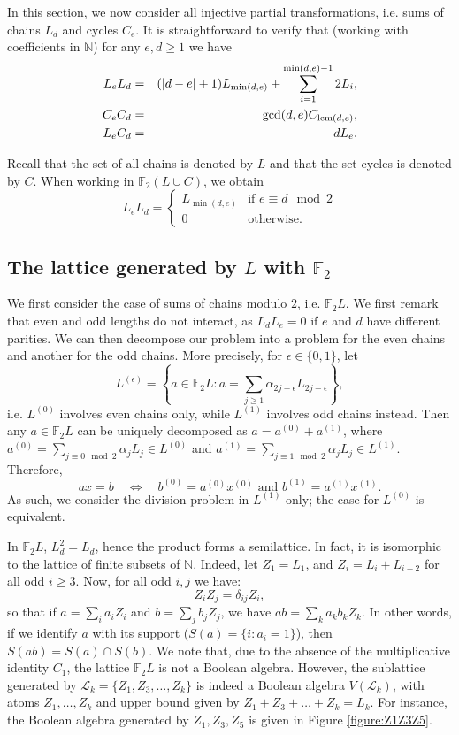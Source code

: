 \documentclass[a4paper, 11pt]{article}
\theoremstyle{plain}
\theoremstyle{definition}
\newcommand{\N} {\mathbb{N}}
\newcommand{\F} {\mathbb{F}}
\newcommand{\lcm}       {\mathrm{lcm}}
\begin{document}
In this section, we now consider all injective partial transformations, i.e. sums of chains 
$L_d$ and cycles $C_e$. It is straightforward to verify that (working with coefficients in $\N$) for any $e, d\geq 1$ we have
\begin{eqnarray*}
L_eL_d  &=& (|d-e|+1)L_{{\rm min}(d,e)} + \sum_{i=1}^{{\rm min}(d,e)-1} 2L_i,\\ 
C_eC_d &=& {\rm gcd}(d,e) C_{\lcm(d,e)},\\
L_eC_d &=& dL_e.
\end{eqnarray*}

Recall that the set of all chains is denoted by $L$ and that the set cycles is denoted by $C$. When working in $\F_2(L \cup C)$, we obtain
\[
    L_e L_d = \begin{cases}
        L_{\min( d,e )} & \text{if } e \equiv d \mod 2 \\
        0 &\text{otherwise}.
    \end{cases}
\]

\subsection{The lattice generated by $L$ with $\F_2$} \label{subsection:semiring_L2}

We first consider the case of sums of chains modulo $2$, i.e. $\F_2 L$. We first remark that even and odd lengths do not interact, as $L_d L_e = 0$ if $e$ and $d$ have different parities. We can then decompose our problem into a problem for the even chains and another for the odd chains. More precisely, for $\epsilon \in \{0,1\}$, let 
\[
    L^{(\epsilon)} = \left\{ a \in \F_2 L : a = \sum_{j \ge 1} \alpha_{2j - \epsilon} L_{2j - \epsilon} \right\}, 
\]
i.e. $L^{(0)}$ involves even chains only, while $L^{(1)}$ involves odd chains instead. Then any $a \in \F_2 L$ can be uniquely decomposed as $a = a^{(0)} + a^{(1)}$, where $a^{(0)} = \sum_{ j \equiv 0 \mod 2 } \alpha_j L_j \in L^{(0)}$ and $a^{(1)} = \sum_{ j \equiv 1 \mod 2 } \alpha_j L_j \in L^{(1)}$. Therefore,
\[
    a x = b \quad \iff \quad b^{(0)} = a^{(0)} x^{(0)} \text{ and } b^{(1)} = a^{(1)} x^{(1)}.
\]
As such, we consider the division problem in $L^{(1)}$ only; the case for $L^{(0)}$ is equivalent.

In $\F_2 L$, $L_d^2 = L_d$, hence the product forms a semilattice. In fact, it is isomorphic to the lattice of finite subsets of $\N$. Indeed, let $Z_1 = L_1$, and $Z_i = L_i + L_{i-2}$ for all odd $i \ge 3$. Now, for all odd $i, j$ we have: 
\[
    Z_i Z_j = \delta_{ij} Z_i,
\]
so that if $a = \sum_i a_i Z_i$ and $b = \sum_j b_j Z_j$, we have $ab = \sum_k a_k b_k Z_k$. In other words, if we identify $a$ with its support ($S(a) = \{ i : a_i = 1\}$), then $S(ab) = S(a) \cap S(b)$.
We note that, due to the absence of the multiplicative identity $C_1$, the lattice $\F_2 L$ is not a Boolean algebra. However, the sublattice generated by $\mathcal{L}_k = \{ Z_1, Z_3, \dots, Z_k\}$ is indeed a Boolean algebra $V( \mathcal{L}_k )$, with atoms $Z_1, \dots, Z_k$ and upper bound given by $Z_1 + Z_3 + \dots + Z_k = L_k$. For instance, the Boolean algebra generated by $Z_1, Z_3, Z_5$ is given in Figure \ref{figure:Z1Z3Z5}.
\end{document}
